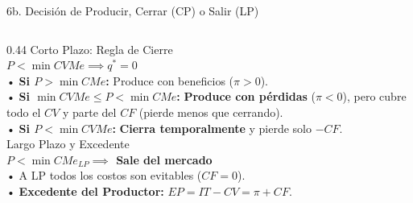 \documentclass[aspectratio=169, 10pt]{beamer}
\begin{document}
\begin{frame}{6b. Decisión de Producir, Cerrar (CP) o Salir (LP)}
\begin{columns}[T]
    \begin{column}{0.44\textwidth}
      {\scriptsize\color{grisTexto}Corto Plazo: Regla de Cierre}\\[1pt]
      {\large\color{rojoAcento}\textbf{\(P < \min CVMe \implies q^* = 0\)}}\\[4pt]
      {\scriptsize
        • \textbf{Si \(P > \min CMe\):} Produce con beneficios (\(\pi > 0\)).\\
        • \textbf{Si \(\min CVMe \le P < \min CMe\):} \textbf{Produce con pérdidas} (\(\pi < 0\)), pero cubre todo el \(CV\) y parte del \(CF\) (pierde menos que cerrando).\\
        • \textbf{Si \(P < \min CVMe\):} \textbf{Cierra temporalmente} y pierde solo \(-CF\).\\[4pt]
      }
      {\scriptsize\color{grisTexto}Largo Plazo y Excedente}\\[1pt]
      {\normalsize\color{azulPrincipal}\textbf{\(P < \min CMe_{LP} \implies\) Sale del mercado}}\\[4pt]
      {\scriptsize
        • A LP todos los costos son evitables (\(CF=0\)).\\
        • \textbf{Excedente del Productor:} \(EP = IT - CV = \pi + CF\).
      }
    \end{column}
  \end{columns}

\end{frame}
\end{document}
